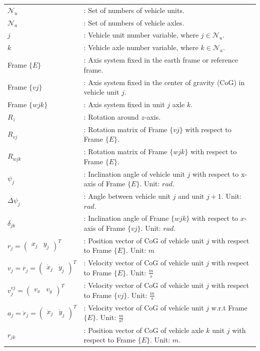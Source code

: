 \documentclass[12pt]{article}
\begin{document}
\begin{table}[H]
\begin{tabular}{p{4cm} p{10cm}}
$\mathcal{N}_u$&: Set of numbers of vehicle units.\\
$\mathcal{N}_a$&: Set of numbers of vehicle axles.\\
$j$ &: Vehicle unit number variable, where $j \in \mathcal{N}_u$.\\
$k$ &: Vehicle axle number variable, where $k \in \mathcal{N}_a$.\\
Frame $\{ E \}$& : Axis system fixed in the earth frame or reference frame.\\
Frame $\{ vj \}$& : Axis system fixed in the center of gravity (CoG) in vehicle unit $j$.\\
Frame $\{ wjk \}$& : Axis system fixed in unit $j$ axle $k$.\\
$R_z$ &: Rotation around $z$-axis.\\
$R_{vj}$ & : Rotation matrix of Frame $\{ vj \}$ with respect to Frame $\{ E \}$.\\
$R_{wjk}$ & : Rotation matrix of Frame $\{ wjk \}$ with respect to Frame $\{ E \}$.\\
$\psi_j$ &: Inclination angle of vehicle unit $j$ with respect to x-axis of Frame $\{ E \}$. Unit: $rad$.\\
$\Delta \psi _j$ &: Angle between vehicle unit $j$ and unit $j+1$. Unit: $rad$.\\
$\delta_{jk}$ &: Inclination angle of Frame $\{ wjk \}$ with respect to $x$-axis of Frame $\{ vj \}$. Unit: $rad$.\\
$r_j = \begin{pmatrix} x_j & y_j \end{pmatrix}^T$ & : Position vector of CoG of vehicle unit $j$ with respect to Frame $ \{ E \}$. Unit: $m$\\
$v_{j} = \dot{r_j} = \begin{pmatrix} \dot{x}_j & \dot{y}_j \end{pmatrix}^T$ & : Velocity vector of CoG of vehicle unit $j$ with respect to Frame $ \{ E \}$. Unit: $ \displaystyle \frac{m}{s}$\\
$v_j^{vj} = \begin{pmatrix} v_x & v_y \end{pmatrix}^T$ & : Velocity vector of CoG of vehicle unit $j$ with respect to Frame $ \{ vj \}$. Unit: $ \displaystyle \frac{m}{s}$\\
$a_j = \ddot{r}_j = \begin{pmatrix} \ddot{x}_j & \ddot{y}_j \end{pmatrix}^T$ & : Velocity vector of CoG of vehicle unit $j$ w.r.t Frame $ \{ E \}$. Unit: $ \displaystyle \frac{m}{s^2}$\\
$r_{jk}$ &: Position vector of CoG of vehicle axle $k$ unit $j$ with respect to Frame $\{ E\}$. Unit: $m$.\\
\end{tabular}
\end{table}
\end{document}
